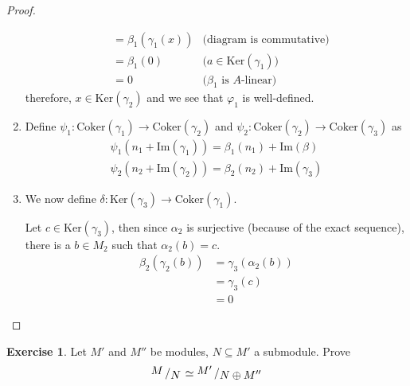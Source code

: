 \documentclass{book}
\theoremstyle{plain}
\theoremstyle{definition}
\newtheorem{exr}[thm]{Exercise}
\theoremstyle{custom_definition}
\newcommand{\Ker}[1]{ \mathrm{Ker} \left( #1 \right) }
\newcommand{\Coker}[1]{ \mathrm{Coker} \left( #1 \right) }
\newcommand{\Imag}[1]{ \mathrm{Im} \left( #1 \right)}
\newcommand{\bigslant}[2]{{\raisebox{.2em}{$#1$}\left/\raisebox{-.2em}{$#2$}\right.}}
\begin{document}
\begin{proof}
\begin{enumerate}
\begin{align}
      &= \beta_1(\gamma_1(x)) & \text{(diagram is commutative)} \\
      &= \beta_1(0) & \text{(\(a \in \Ker{\gamma_1})\)} \\
      &= 0 & \text{(\(\beta_1\) is \(A\)-linear)}
    \end{align}
    therefore, \(x \in \Ker{\gamma_2}\) and we see that \(\varphi_1\) is well-defined.
    \item Define \(\psi_1: \Coker{\gamma_1} \longrightarrow \Coker{\gamma_2}\) and \(\psi_2: \Coker{\gamma_2} \longrightarrow \Coker{\gamma_3}\) as
    \begin{align}
      \psi_1(n_1 + \Imag{\gamma_1}) = \beta_1(n_1) + \Imag{\beta} \\
      \psi_2(n_2 + \Imag{\gamma_2}) = \beta_2(n_2) + \Imag{\gamma_3}
    \end{align}
    \item We now define \(\delta: \Ker{\gamma_3} \longrightarrow \Coker{\gamma_1}\).
    
    Let \(c \in \Ker{\gamma_3}\), then since \(\alpha_2\) is surjective (because of the exact sequence), there is a \(b \in M_2\) such that \(\alpha_2(b) = c\).
    \begin{align}
      \beta_2(\gamma_2(b)) &= \gamma_3(\alpha_2(b)) \\
      &= \gamma_3(c) \\
      &= 0
    \end{align}
    
  \end{enumerate}
\end{proof}



\begin{exr}
  Let \(M'\) and \(M''\) be modules, \(N \subseteq M'\) a submodule. Prove
  \begin{equation}
    \bigslant{M}{N} \simeq \bigslant{M'}{N \oplus M''}
  \end{equation}
\end{exr}
\end{document}
